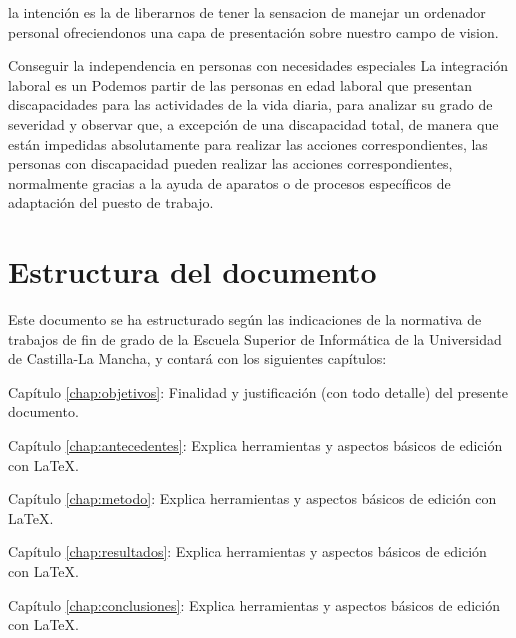  la intención es la de liberarnos de tener la sensacion de manejar un ordenador personal ofreciendonos una capa de presentación sobre nuestro campo de vision. 



Conseguir la independencia en personas con necesidades especiales La integración laboral es un
Podemos partir de las personas en edad laboral que presentan discapacidades para las actividades de la vida diaria, para analizar su grado de severidad y observar que, a excepción de una discapacidad total, de manera que están impedidas absolutamente para realizar las acciones correspondientes, las personas con discapacidad pueden realizar las acciones correspondientes, normalmente gracias a la ayuda de aparatos o de procesos específicos de adaptación del puesto de trabajo.









 
\section{Estructura del documento}

  Este documento se ha estructurado según las indicaciones de la normativa de trabajos de fin de grado de la Escuela Superior de Informática de la Universidad de Castilla-La Mancha, y contará con los siguientes capítulos:
  \begin{definitionlist}
  \item[Capítulo \ref{chap:objetivos}: \nameref{chap:objetivos}] Finalidad y justificación  (con todo detalle) del presente documento.
  \item[Capítulo \ref{chap:antecedentes}: \nameref{chap:antecedentes}] Explica herramientas y aspectos básicos de edición con \LaTeX.
  \item[Capítulo \ref{chap:metodo}: \nameref{chap:metodo}] Explica herramientas y aspectos básicos de edición con \LaTeX.
  \item[Capítulo \ref{chap:resultados}: \nameref{chap:resultados}] Explica herramientas y aspectos básicos de edición con \LaTeX.
  \item[Capítulo \ref{chap:conclusiones}: \nameref{chap:conclusiones}] Explica herramientas y aspectos básicos de edición con \LaTeX.
  \end{definitionlist}



